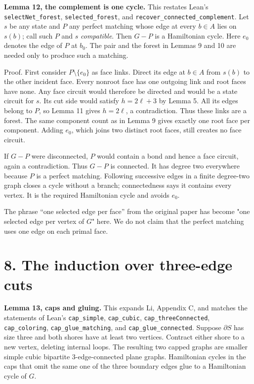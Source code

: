 \documentclass[a4paper,11pt]{amsart}
\begin{document}
\textbf{Lemma 12, the complement is one cycle.} This restates Lean's \nolinkurl{selectNet_forest}, \nolinkurl{selected_forest}, and \nolinkurl{recover_connected_complement}. Let $s$ be any state and $P$ any perfect matching whose edge at every $b\in A$ lies on $s(b)$; call such $P$ and $s$ \emph{compatible}. Then $G-P$ is a Hamiltonian cycle. Here $e_0$ denotes the edge of $P$ at $b_0$. The pair and the forest in Lemmas 9 and 10 are needed only to produce such a matching.

Proof. First consider $P\setminus\{e_0\}$ as face links. Direct its edge at $b\in A$ from $s(b)$ to the other incident face. Every nonroot face has one outgoing link and root faces have none. Any face circuit would therefore be directed and would be a state circuit for $s$. Its cut side would satisfy $h=2\ell+3$ by Lemma 5. All its edges belong to $P$, so Lemma 11 gives $h=2\ell$, a contradiction. Thus these links are a forest. The same component count as in Lemma 9 gives exactly one root face per component. Adding $e_0$, which joins two distinct root faces, still creates no face circuit.

If $G-P$ were disconnected, $P$ would contain a bond and hence a face circuit, again a contradiction. Thus $G-P$ is connected. It has degree two everywhere because $P$ is a perfect matching. Following successive edges in a finite degree-two graph closes a cycle without a branch; connectedness says it contains every vertex. It is the required Hamiltonian cycle and avoids $e_0$.

The phrase ``one selected edge per face'' from the original paper has become "one selected edge per vertex of $G$" here. We do not claim that the perfect matching uses one edge on each primal face.

\section*{8. The induction over three-edge cuts}

\textbf{Lemma 13, caps and gluing.} This expands Li, Appendix C, and matches the statements of Lean's \nolinkurl{cap_simple}, \nolinkurl{cap_cubic}, \nolinkurl{cap_threeConnected}, \nolinkurl{cap_coloring}, \nolinkurl{cap_glue_matching}, and \nolinkurl{cap_glue_connected}. Suppose $\partial S$ has size three and both shores have at least two vertices. Contract either shore to a new vertex, deleting internal loops. The resulting two capped graphs are smaller simple cubic bipartite 3-edge-connected plane graphs. Hamiltonian cycles in the caps that omit the same one of the three boundary edges glue to a Hamiltonian cycle of $G$.
\end{document}
